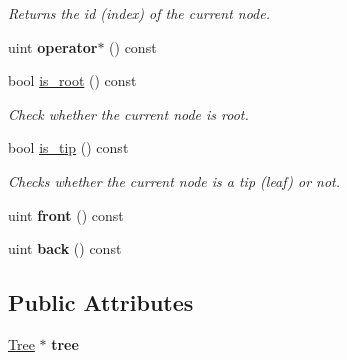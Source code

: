 \begin{DoxyCompactItemize}
\begin{DoxyCompactList}\small\item\em Returns the id (index) of the current node. \end{DoxyCompactList}\item 
uint {\bfseries operator$\ast$} () const \hypertarget{classTreeIterator_a94819be0c93c76f72cf34b584d7add79}{}\label{classTreeIterator_a94819be0c93c76f72cf34b584d7add79}

\item 
bool \hyperlink{classTreeIterator_a641055ff6b66b09cc6b4826e3b826b28}{is\+\_\+root} () const \hypertarget{classTreeIterator_a641055ff6b66b09cc6b4826e3b826b28}{}\label{classTreeIterator_a641055ff6b66b09cc6b4826e3b826b28}

\begin{DoxyCompactList}\small\item\em Check whether the current node is root. \end{DoxyCompactList}\item 
bool \hyperlink{classTreeIterator_a08d3a3504b7fac8c0690ab4f9bc8290a}{is\+\_\+tip} () const \hypertarget{classTreeIterator_a08d3a3504b7fac8c0690ab4f9bc8290a}{}\label{classTreeIterator_a08d3a3504b7fac8c0690ab4f9bc8290a}

\begin{DoxyCompactList}\small\item\em Checks whether the current node is a tip (leaf) or not. \end{DoxyCompactList}\item 
uint {\bfseries front} () const \hypertarget{classTreeIterator_ae2db13b649fed318efb85eb84209c9d1}{}\label{classTreeIterator_ae2db13b649fed318efb85eb84209c9d1}

\item 
uint {\bfseries back} () const \hypertarget{classTreeIterator_a6916561fe4515aa88b4af8344b16c1fd}{}\label{classTreeIterator_a6916561fe4515aa88b4af8344b16c1fd}

\end{DoxyCompactItemize}
\subsection*{Public Attributes}
\begin{DoxyCompactItemize}
\item 
\hyperlink{classTree}{Tree} $\ast$ {\bfseries tree}\hypertarget{classTreeIterator_adb38d3ef0bf6f6cb75ea183b146946ed}{}\label{classTreeIterator_adb38d3ef0bf6f6cb75ea183b146946ed}

\end{DoxyCompactItemize}
